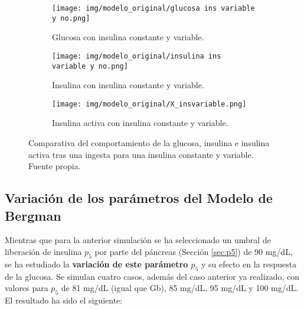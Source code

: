 \begin{figure}[htbp]
    \centering
    \begin{subfigure}[b]{0.9\linewidth} %
        \centering
        \texttt{[image: img/modelo\_original/glucosa ins variable y no.png]}
        \caption{Glucosa con insulina constante y variable.}
        \label{fig:bergman_glucosa}
    \end{subfigure}
    
    \vspace{0.5cm} %

    \begin{subfigure}[b]{0.9\linewidth} %
        \centering
        \texttt{[image: img/modelo\_original/insulina ins variable y no.png]}
        \caption{Insulina con insulina constante y variable.}
        \label{fig:bergman_insulina}
    \end{subfigure}

    \vspace{0.5cm} %

    \begin{subfigure}[b]{0.9\linewidth} %
        \centering
        \texttt{[image: img/modelo\_original/X\_insvariable.png]}
        \caption{Insulina activa con insulina constante y variable.}
        \label{fig:bergman_X}
    \end{subfigure}
    
    \caption{Comparativa del comportamiento de la glucosa, insulina e insulina activa tras una ingesta para una insulina constante y variable. Fuente propia.}
    \label{fig:bergman_insulinas_comp}
\end{figure}

\subsection{Variación de los parámetros del Modelo de Bergman}

Mientras que para la anterior simulación se ha seleccionado un umbral de liberación de insulina $p_5$ por parte del páncreas (Sección \ref{sec:p5})  de 90 mg/dL, se ha estudiado la \textbf{variación de este parámetro $p_5$} y su efecto en la respuesta de la glucosa. Se simulan cuatro casos, además del caso anterior ya realizado, con valores para $p_5$ de 81 mg/dL (igual que Gb), 85 mg/dL, 95 mg/dL y 100 mg/dL.
El resultado ha sido el siguiente:

